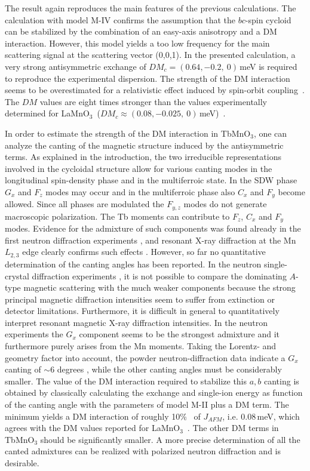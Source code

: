 \documentclass[aps,prb,twocolumn,superscriptaddress,showpacs,floatfix]{revtex4-2}
\newcommand{\lamno}{LaMnO$_3$}
\newcommand{\bcplane}{$bc$}
\begin{document}
The result again reproduces the main features of the previous calculations. 
The calculation with model M-IV confirms the assumption that the \bcplane-spin cycloid can be stabilized by the combination of an easy-axis anisotropy and a DM interaction. However, this model yields a too low
frequency for the main scattering signal at the scattering vector (0,0,1). 
In the presented calculation, a very strong antisymmetric exchange of $DM_c=(0.64,-0.2,~0)$\,\si{\meV} is required to reproduce the experimental dispersion. The strength of the DM interaction seems to be overestimated for a relativistic effect induced by spin-orbit coupling~\cite[p. 144]{book_khomskii}. The $DM$ values are eight times stronger than the values experimentally determined for \lamno\ ($DM_c\approx(0.08,-0.025,~0)$\,\si{\meV})~\cite{Deisenhofer2002}.

In order to estimate the strength of the DM interaction in TbMnO$_3$, one can analyze the canting of the magnetic structure induced by the antisymmetric terms. As explained in the introduction, the two irreducible representations involved in the cycloidal structure allow for various canting modes in the longitudinal spin-density phase and in the multiferroic state. 
In the SDW phase $G_x$ and $F_z$ modes may occur
and in the multiferroic phase also $C_x$ and $F_y$ become allowed. 
Since all phases are modulated the $F_{y,z}$ modes do not generate macroscopic polarization. The Tb moments can contribute to $F_z$, $C_x$ and $F_y$ modes. 
Evidence for the admixture of such components was found already in the first neutron diffraction experiments \cite{Quezel1977,Blasco2000,Kajimoto2004}, and resonant X-ray diffraction at the Mn $L_{2,3}$ edge clearly confirms such effects \cite{Wilkins2009,Jang2011}. 
However, so far no quantitative determination of the canting angles has been reported.
In the neutron single-crystal diffraction experiments \cite{Kajimoto2004}, it is not possible to compare the dominating $A$-type magnetic scattering with the much weaker components because the strong principal magnetic diffraction intensities seem to suffer from extinction
or detector limitations. Furthermore, it is difficult  in general to quantitatively interpret resonant magnetic X-ray diffraction intensities. 
In the neutron experiments the $G_x$ component seems to be the strongest admixture \cite{Blasco2000,Kajimoto2004} and it furthermore purely arises from the Mn moments.
Taking the Lorentz- and geometry factor into account, the powder neutron-diffraction data indicate a $G_x$ canting of $\sim$6 degrees \cite{Blasco2000}, while the other canting angles must be considerably smaller.
The value of the DM interaction required to stabilize this $a,b$ canting is obtained by classically calculating the exchange and single-ion energy as function of the canting angle
with the parameters of model M-II plus a DM term.
The minimum yields a DM interaction of roughly 10\% \ of $J_{AFM}$, i.e. 0.08\,meV, which agrees with the DM values reported for LaMnO$_3$~\cite{Deisenhofer2002}.
The other DM terms in TbMnO$_3$ should be significantly smaller. 
A more precise determination of all the canted admixtures can be realized with polarized neutron diffraction and is desirable. 
 
\end{document}
